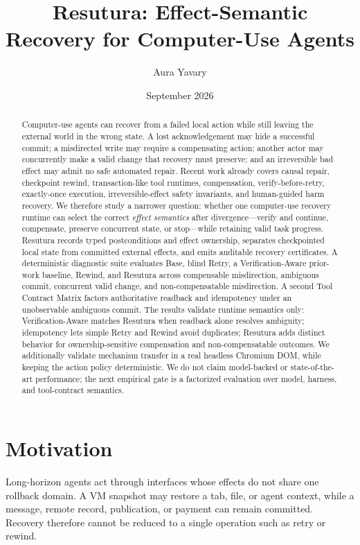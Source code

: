 \documentclass[10pt]{article}
\title{Resutura: Effect-Semantic Recovery for Computer-Use Agents}
\author{Aura Yavary}
\date{September 2026}
\begin{document}
\maketitle

\begin{abstract}
Computer-use agents can recover from a failed local action while still leaving the external world in the wrong state. A lost acknowledgement may hide a successful commit; a misdirected write may require a compensating action; another actor may concurrently make a valid change that recovery must preserve; and an irreversible bad effect may admit no safe automated repair. Recent work already covers causal repair, checkpoint rewind, transaction-like tool runtimes, compensation, verify-before-retry, exactly-once execution, irreversible-effect safety invariants, and human-guided harm recovery. We therefore study a narrower question: whether one computer-use recovery runtime can select the correct \emph{effect semantics} after divergence---verify and continue, compensate, preserve concurrent state, or stop---while retaining valid task progress. Resutura records typed postconditions and effect ownership, separates checkpointed local state from committed external effects, and emits auditable recovery certificates. A deterministic diagnostic suite evaluates Base, blind Retry, a Verification-Aware prior-work baseline, Rewind, and Resutura across compensable misdirection, ambiguous commit, concurrent valid change, and non-compensatable misdirection. A second Tool Contract Matrix factors authoritative readback and idempotency under an unobservable ambiguous commit. The results validate runtime semantics only: Verification-Aware matches Resutura when readback alone resolves ambiguity; idempotency lets simple Retry and Rewind avoid duplicates; Resutura adds distinct behavior for ownership-sensitive compensation and non-compensatable outcomes. We additionally validate mechanism transfer in a real headless Chromium DOM, while keeping the action policy deterministic. We do not claim model-backed or state-of-the-art performance; the next empirical gate is a factorized evaluation over model, harness, and tool-contract semantics.
\end{abstract}

\section{Motivation}
Long-horizon agents act through interfaces whose effects do not share one rollback domain. A VM snapshot may restore a tab, file, or agent context, while a message, remote record, publication, or payment can remain committed. Recovery therefore cannot be reduced to a single operation such as retry or rewind.
\end{document}
